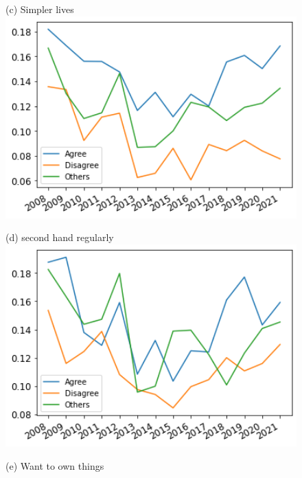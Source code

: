 \documentclass[12pt]{article}
\begin{document}
\begin{figure}[h!!]
\begin{minipage}[h!!]{0.32\textwidth}
\end{minipage}
	\begin{minipage}[h!!]{0.32\textwidth}  
	\centering\footnotesize{(c) Simpler lives}
	\includegraphics[width=1\textwidth]{../codding_data/results/liss/broad_groups_work_redcuctionqk20a181_actual.png}
\end{minipage}
	\begin{minipage}[h!!]{0.32\textwidth}  
	\centering\footnotesize{(d) second hand regularly}
	\includegraphics[width=1\textwidth]{../codding_data/results/liss/broad_groups_work_redcuctionqk20a135_actual.png}
\end{minipage}
		\begin{minipage}[h!!]{0.32\textwidth}  
		\centering\footnotesize{(e) Want to own things}

\end{minipage}
\end{figure}
\end{document}
